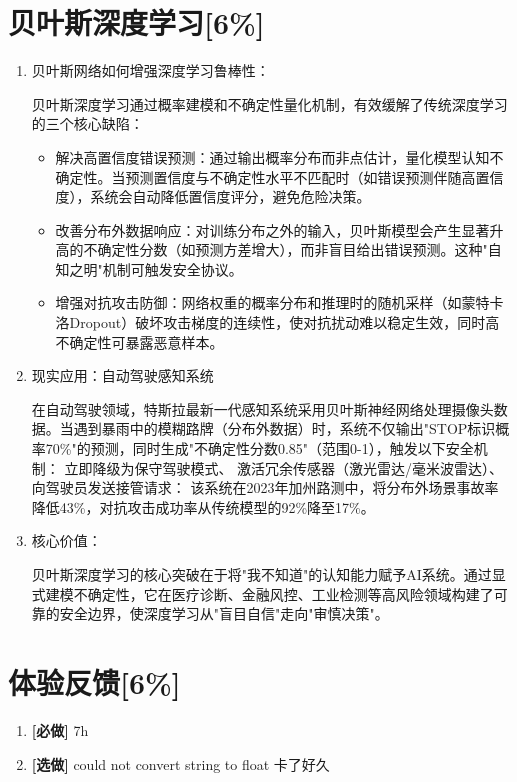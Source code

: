 \documentclass{article}
\begin{document}
\section{贝叶斯深度学习[6\%]}
\begin{enumerate}
	\item 贝叶斯网络如何增强深度学习鲁棒性：
	
	贝叶斯深度学习通过概率建模和不确定性量化机制，有效缓解了传统深度学习的三个核心缺陷：
	\begin{itemize}
		\item 解决高置信度错误预测：通过输出概率分布而非点估计，量化模型认知不确定性。当预测置信度与不确定性水平不匹配时（如错误预测伴随高置信度），系统会自动降低置信度评分，避免危险决策。
		\item 改善分布外数据响应：对训练分布之外的输入，贝叶斯模型会产生显著升高的不确定性分数（如预测方差增大），而非盲目给出错误预测。这种"自知之明"机制可触发安全协议。
		\item 增强对抗攻击防御：网络权重的概率分布和推理时的随机采样（如蒙特卡洛Dropout）破坏攻击梯度的连续性，使对抗扰动难以稳定生效，同时高不确定性可暴露恶意样本。
	\end{itemize}
	\item 现实应用：自动驾驶感知系统
	
	在自动驾驶领域，特斯拉最新一代感知系统采用贝叶斯神经网络处理摄像头数据。当遇到暴雨中的模糊路牌（分布外数据）时，系统不仅输出"STOP标识概率70\%"的预测，同时生成"不确定性分数0.85"（范围0-1），触发以下安全机制：
	立即降级为保守驾驶模式、
	激活冗余传感器（激光雷达/毫米波雷达）、
	向驾驶员发送接管请求：
	该系统在2023年加州路测中，将分布外场景事故率降低43\%，对抗攻击成功率从传统模型的92\%降至17\%。
	\item 核心价值：
	
	贝叶斯深度学习的核心突破在于将"我不知道"的认知能力赋予AI系统。通过显式建模不确定性，它在医疗诊断、金融风控、工业检测等高风险领域构建了可靠的安全边界，使深度学习从"盲目自信"走向"审慎决策"。
\end{enumerate}

\section*{体验反馈[6\%]}

\begin{enumerate}[label=(\alph*), start=1]
    \item \textbf{[必做]} %
    7h
    \item \textbf{[选做]} %
    could not convert string to float 卡了好久
\end{enumerate}
\end{document}
